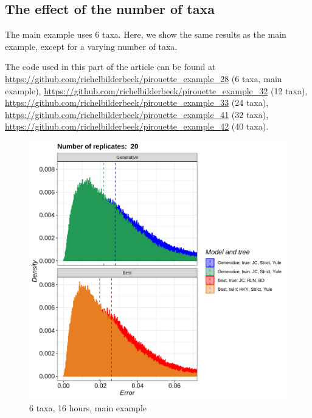 \subsection{The effect of the number of taxa}
\label{subsec:n_taxa}

The main example uses 6 taxa. Here, we show the same results as the main example,
except for a varying number of taxa.

The code used in this part of the article can be found at 
\url{https://github.com/richelbilderbeek/pirouette_example_28} (6 taxa, main example),
\url{https://github.com/richelbilderbeek/pirouette_example_32} (12 taxa),
\url{https://github.com/richelbilderbeek/pirouette_example_33} (24 taxa),
\url{https://github.com/richelbilderbeek/pirouette_example_41} (32 taxa),
\url{https://github.com/richelbilderbeek/pirouette_example_42} (40 taxa). 

\begin{figure}[H]
  \includegraphics[width=\textwidth]{pirouette_example_28/errors.png}
  \caption{6 taxa, 16 hours, main example}
\end{figure}

